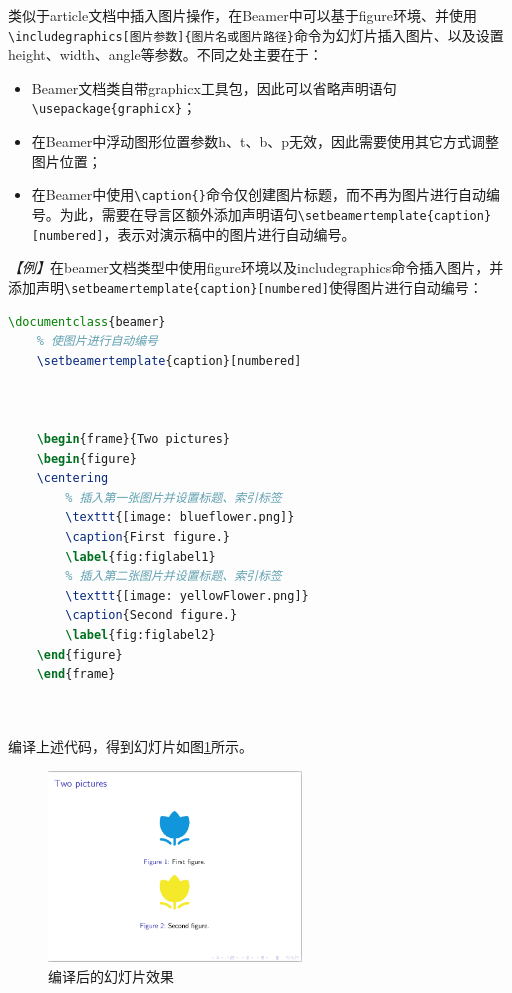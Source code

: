 类似于article文档中插入图片操作，在Beamer中可以基于figure环境、并使用\texttt{\textbackslash{}includegraphics[图片参数]\{图片名或图片路径\}}命令为幻灯片插入图片、以及设置height、width、angle等参数。不同之处主要在于：
\begin{itemize}
    \item Beamer文档类自带graphicx工具包，因此可以省略声明语句\texttt{\textbackslash{}usepackage\{graphicx\}}；
    \item 在Beamer中浮动图形位置参数h、t、b、p无效，因此需要使用其它方式调整图片位置；
    \item 在Beamer中使用\texttt{\textbackslash{}caption\{\}}命令仅创建图片标题，而不再为图片进行自动编号。为此，需要在导言区额外添加声明语句\texttt{\textbackslash{}setbeamertemplate\{caption\}[numbered]}，表示对演示稿中的图片进行自动编号。
\end{itemize}

\emph{【例】}在beamer文档类型中使用figure环境以及includegraphics命令插入图片，并添加声明\texttt{\textbackslash{}setbeamertemplate\{caption\}[numbered]}使得图片进行自动编号：
\begin{lstlisting}[language=TeX]
    \documentclass{beamer}
    % 使图片进行自动编号
    \setbeamertemplate{caption}[numbered]

    

    \begin{frame}{Two pictures}
    \begin{figure}
    \centering
        % 插入第一张图片并设置标题、索引标签
        \texttt{[image: blueflower.png]}
        \caption{First figure.}
        \label{fig:figlabel1}
        % 插入第二张图片并设置标题、索引标签
        \texttt{[image: yellowFlower.png]}
        \caption{Second figure.}
        \label{fig:figlabel2}
    \end{figure}
    \end{frame}

    
\end{lstlisting}

编译上述代码，得到幻灯片如图\ref{fig:941}所示。

\begin{figure}[htbp]
    \centering
    \includegraphics[width = 0.6\textwidth]{images/ch_9/eg6_1new.png}
    \caption{编译后的幻灯片效果}
    \label{fig:941}
\end{figure}

